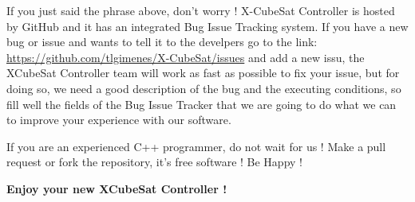 \documentclass[pdftex,11pt,a4paper,titlepage]{report}
\begin{document}
If you just said the phrase above, don't worry ! X-CubeSat Controller is hosted by GitHub and it has an integrated Bug Issue Tracking system. If you have a new bug or issue and wants to tell it to the develpers go to the link: \url{https://github.com/tlgimenes/X-CubeSat/issues} and add a new issu, the XCubeSat Controller team will work as fast as possible to fix your issue, but for doing so, we need a good description of the bug and the executing conditions, so fill well the fields of the Bug Issue Tracker that we are going to do what we can to improve your experience with our software.

If you are an experienced C++ programmer, do not wait for us ! Make a pull request or fork the repository, it's free software ! Be Happy !

\vspace{10cm}
\hspace{6cm}
\textbf{Enjoy your new XCubeSat Controller !}
\end{document}
